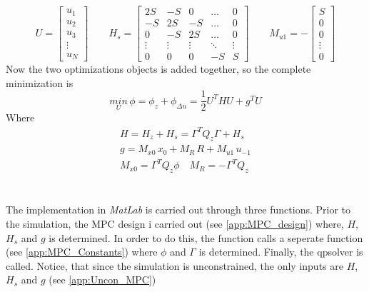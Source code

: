 \begin{equation*}
    U=\begin{bmatrix}
    u_1\\u_2\\u_3\\\vdots\\u_N
    \end{bmatrix}\qquad
    H_s=\begin{bmatrix}
    2S & -S & 0 & \dots & 0\\
    -S & 2S & -S & \dots & 0\\
    0 & -S & 2S & \dots & 0\\
    \vdots & \vdots & \vdots & \ddots & \vdots\\
    0 & 0 & 0 & -S & S
    \end{bmatrix}\qquad
    M_{u1}=-\begin{bmatrix}
    S \\ 0 \\ 0 \\ \vdots \\ 0
    \end{bmatrix}
\end{equation*}
Now the two optimizations objects is added together, so the complete minimization is
\begin{equation}
    \label{eq:MPC_obj}
    \underset{U}{min}\,\phi=\phi_z+\phi_{\Delta u}=\frac{1}{2}U^THU+g^TU
\end{equation}
Where
\begin{equation}
    \label{eq:M_mat_MPC}
    \begin{gathered}
        H=H_z+H_s=\Gamma^TQ_z\Gamma+H_s\\
        g=M_{x0}\,x_0+M_R\,R+M_{u1}\,u_{-1}\\
        M_{x0} = \Gamma^TQ_z\phi \quad M_R=-\Gamma^TQ_z
    \end{gathered}
\end{equation}
\\\\
The implementation in \textit{MatLab} is carried out through three functions. Prior to the simulation, the MPC design i carried out (see \cref{app:MPC_design}) where, $H$, $H_s$ and $g$ is determined. In order to do this, the function calls a seperate function (see \cref{app:MPC_Constants}) where $\phi$ and $\Gamma$ is determined. Finally, the qpsolver is called. Notice, that since the simulation is unconstrained, the only inputs are $H$, $H_s$ and $g$ (see \cref{app:Uncon_MPC})